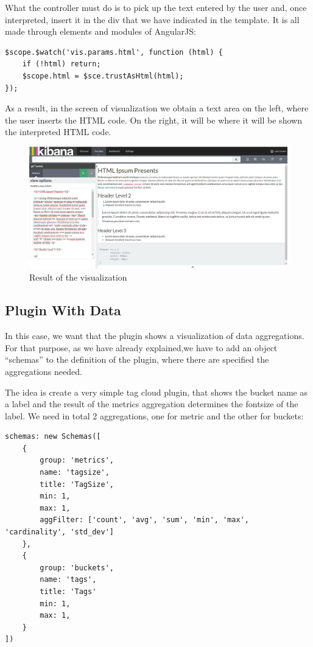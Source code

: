 \documentclass[a4paper, 12pt]{book}
\begin{document}
What the controller must do is to pick up the text entered by the user and, once interpreted, insert it in the div that we have indicated in the template. It is all made through elements and modules of AngularJS:

\begin{lstlisting}[frame=single]
$scope.$watch('vis.params.html', function (html) {
    if (!html) return;
    $scope.html = $sce.trustAsHtml(html);
});
\end{lstlisting}

As a result, in the screen of visualization we obtain a text area on the left, where the user inserts the HTML code. On the right, it will be where it will be shown the interpreted HTML code.

\begin{figure}[H]
  \centering
  \includegraphics[width=16cm, keepaspectratio]{img/development/html}
  \caption{Result of the visualization}
  \label{fig:pluginhtml}
\end{figure}


\subsection{Plugin With Data}

In this case, we want that the plugin shows a visualization of data aggregations. For that purpose, as we have already explained,we have to add an object “schemas” to the definition of the plugin, where there are specified the aggregations needed.

The idea is create a very simple tag cloud plugin, that shows the bucket name as a label and the result of the metrics aggregation determines the fontsize of the label. We need in total 2 aggregations, one for metric and the other for buckets:

\begin{lstlisting}[frame=single]
schemas: new Schemas([
	{
		group: 'metrics',
		name: 'tagsize',
		title: 'TagSize',
		min: 1,
		max: 1,
		aggFilter: ['count', 'avg', 'sum', 'min', 'max', 'cardinality', 'std_dev']
	},
	{
		group: 'buckets',
		name: 'tags',
		title: 'Tags'
		min: 1,
		max: 1,
	}
])
\end{lstlisting}
\end{document}
